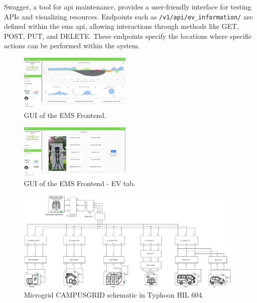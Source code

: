 \documentclass[preprint, 10pt, 5p]{elsarticle}
\begin{document}
Swagger, a tool for \gls{api} maintenance, provides a user-friendly interface 
for testing APIs and visualizing resources. Endpoints such as 
\texttt{/v1/api/ev\_information/} are defined within the 
\gls{ems} \gls{api}, allowing interactions through methods like GET, POST, PUT, 
and DELETE. These endpoints specify the locations where specific actions can 
be performed within the system.

\begin{figure}[!ht]
    \centering
    \includegraphics[width=0.48\textwidth]{Figures/EMS/dashboard.jpg}
    \caption{GUI of the EMS Frontend.}
    \label{fig:EMS_Frontend}
\end{figure}

\begin{figure}[!ht]
    \centering
    \includegraphics[width=0.48\textwidth]{Figures/EMS/EVs.png}
    \caption{GUI of the EMS Frontend - EV tab.}
    \label{fig:EMS_Frontend_ev}
\end{figure}

\begin{figure}[!ht]
    \centering
    \includegraphics[width=0.98\textwidth]{Figures/schematic_HIL.pdf}
    \caption{Microgrid CAMPUSGRID schematic in Typhoon HIL 604.}
    \label{fig:Microgrid_Schematic}
\end{figure}
\end{document}
